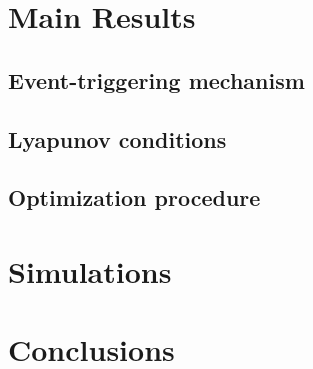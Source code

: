 \documentclass{article}
\begin{document}
\section{Main Results}

\subsection{Event-triggering mechanism}

\subsection{Lyapunov conditions}

\subsection{Optimization procedure}

\section{Simulations}

\section{Conclusions}

\printbibliography
\end{document}
